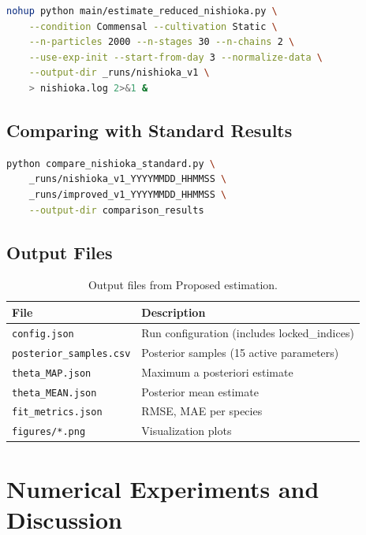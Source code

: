 \documentclass[11pt,a4paper]{article}
\begin{document}
\begin{lstlisting}[language=Bash]
nohup python main/estimate_reduced_nishioka.py \
    --condition Commensal --cultivation Static \
    --n-particles 2000 --n-stages 30 --n-chains 2 \
    --use-exp-init --start-from-day 3 --normalize-data \
    --output-dir _runs/nishioka_v1 \
    > nishioka.log 2>&1 &
\end{lstlisting}

\subsection{Comparing with Standard Results}

\begin{lstlisting}[language=Bash]
python compare_nishioka_standard.py \
    _runs/nishioka_v1_YYYYMMDD_HHMMSS \
    _runs/improved_v1_YYYYMMDD_HHMMSS \
    --output-dir comparison_results
\end{lstlisting}

\subsection{Output Files}

\begin{table}[h]
\centering
\begin{tabular}{ll}
\toprule
\textbf{File} & \textbf{Description} \\
\midrule
\texttt{config.json} & Run configuration (includes locked\_indices) \\
\texttt{posterior\_samples.csv} & Posterior samples (15 active parameters) \\
\texttt{theta\_MAP.json} & Maximum a posteriori estimate \\
\texttt{theta\_MEAN.json} & Posterior mean estimate \\
\texttt{fit\_metrics.json} & RMSE, MAE per species \\
\texttt{figures/*.png} & Visualization plots \\
\bottomrule
\end{tabular}
\caption{Output files from Proposed estimation.}
\label{tab:output}
\end{table}

\section{Numerical Experiments and Discussion}
\end{document}
